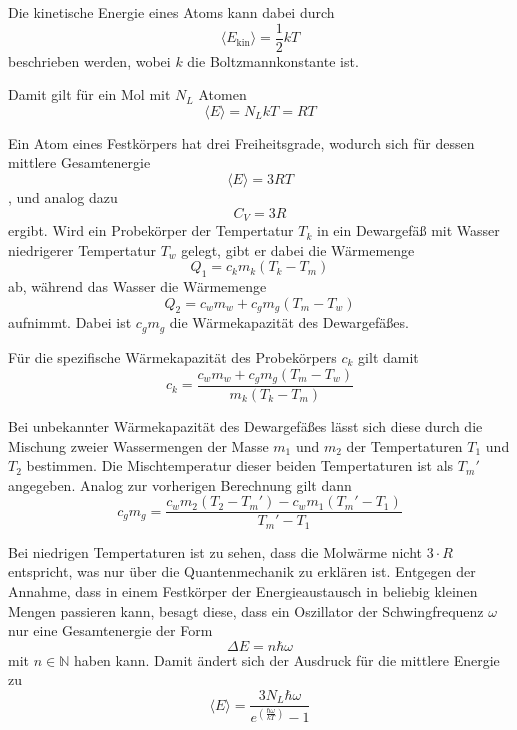 Die kinetische Energie eines Atoms kann dabei durch 
\begin{equation}
    \langle E_\text{kin} \rangle = \frac{1}2 k T
\end{equation}
beschrieben werden, wobei $k$ die Boltzmannkonstante ist.

Damit gilt für ein Mol mit $N_L$ Atomen 
\begin{equation}
    \langle E \rangle = N_L k T = R T 
\end{equation}

Ein Atom eines Festkörpers hat drei Freiheitsgrade, wodurch sich für dessen mittlere Gesamtenergie 
\begin{equation}
    \langle E \rangle = 3 R T 
\end{equation},
und analog dazu 
\begin{equation}
    C_V = 3 R
\end{equation}
ergibt.
Wird ein Probekörper der Tempertatur $T_k$ in ein Dewargefäß mit Wasser niedrigerer Tempertatur $T_w$ gelegt, gibt er 
dabei die Wärmemenge 
\begin{equation}
    Q_1 = c_k m_k (T_k - T_m)
\end{equation}
ab, während das Wasser die Wärmemenge 
\begin{equation}
    Q_2 = c_w m_w + c_g m_g (T_m - T_w)
\end{equation}
aufnimmt.
Dabei ist $c_g m_g$ die Wärmekapazität des Dewargefäßes.

Für die spezifische Wärmekapazität des Probekörpers $c_k$ gilt damit 
\begin{equation}
    c_k = \frac{c_w m_w + c_g m_g (T_m - T_w)}{m_k (T_k - T_m)}
    \label{eqn:c_k}
\end{equation}

Bei unbekannter Wärmekapazität des Dewargefäßes lässt sich diese durch die Mischung zweier Wassermengen der Masse $m_1$ und $m_2$
der Tempertaturen $T_1$ und $T_2$ bestimmen. Die Mischtemperatur dieser beiden Tempertaturen ist als $T_m'$ angegeben.
Analog zur vorherigen Berechnung gilt dann
\begin{equation}
    c_g m_g = \frac{c_w m_2 (T_2 - T_m') - c_w m_1 (T_m' - T_1)}{T_m' - T_1} 
    \label{eqn:c_g}
\end{equation}


Bei niedrigen Tempertaturen ist zu sehen, dass die Molwärme nicht $3\cdot R$ entspricht, was nur über die Quantenmechanik zu 
erklären ist. Entgegen der Annahme, dass in einem Festkörper der Energieaustausch in beliebig kleinen Mengen passieren kann, besagt
diese, dass ein Oszillator der Schwingfrequenz $\omega$ nur eine Gesamtenergie der Form 
\begin{equation}
    \Delta E = n \hbar \omega 
\end{equation}
mit $n \in \mathds{N}$ haben kann. Damit ändert sich der Ausdruck für die mittlere Energie zu 
\begin{equation}
    \langle E \rangle = \frac{3 N_L \hbar \omega}{e^{(\frac{\hbar \omega}{k T})}-1}
    \label{eqn:e_qm}
\end{equation}

